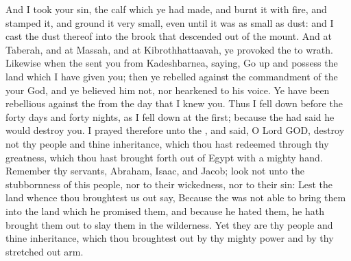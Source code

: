 \begin{biblechapter}
\verse And I took your sin, the calf which ye had made, and burnt it with fire, and stamped it, and ground it very small, even until it was as small as dust: and I cast the dust thereof into the brook that descended out of the mount.
\verse And at Taberah, and at Massah, and at Kibrothhattaavah, ye provoked the \LORD to wrath.
\verse Likewise when the \LORD sent you from Kadeshbarnea, saying, Go up and possess the land which I have given you; then ye rebelled against the commandment of the \LORD your God, and ye believed him not, nor hearkened to his voice.
\verse Ye have been rebellious against the \LORD from the day that I knew you.
\verse Thus I fell down before the \LORD forty days and forty nights, as I fell down at the first; because the \LORD had said he would destroy you.
\verse I prayed therefore unto the \LORD, and said, O Lord GOD, destroy not thy people and thine inheritance, which thou hast redeemed through thy greatness, which thou hast brought forth out of Egypt with a mighty hand.
\verse Remember thy servants, Abraham, Isaac, and Jacob; look not unto the stubbornness of this people, nor to their wickedness, nor to their sin:
\verse Lest the land whence thou broughtest us out say, Because the \LORD was not able to bring them into the land which he promised them, and because he hated them, he hath brought them out to slay them in the wilderness.
\verse Yet they are thy people and thine inheritance, which thou broughtest out by thy mighty power and by thy stretched out arm.
\end{biblechapter}

